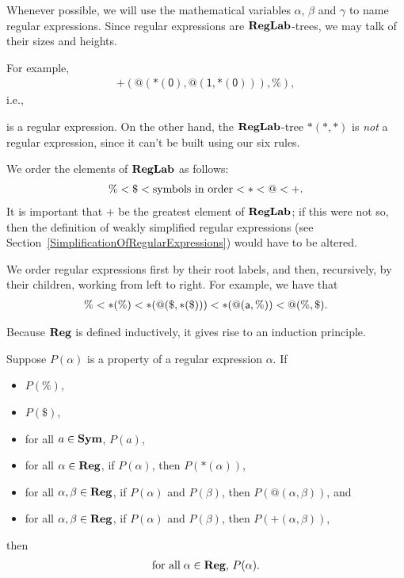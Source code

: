 Whenever possible, we will use the mathematical variables
$\alpha$, $\beta$ and $\gamma$
%
%
to name regular expressions.  Since
regular expressions are $\mathbf{RegLab}$-trees, we may talk of their sizes
and heights.

For example,
\begin{gather*}
\mathsf{{+}(@({*}(0),@(1,{*}(0))),\%)} ,
\end{gather*}
i.e.,
\begin{center}

\end{center}
is a regular expression.  On the other hand, the $\mathbf{RegLab}$-tree
$*(*,*)$ is \emph{not} a regular expression, since it can't be
built using our six rules.

We order the elements of $\mathbf{RegLab}$ as follows:
\begin{gather*}
\% < \$ < \allowbreak\mbox{symbols in order}\allowbreak < {*} < @ < {+} .
\end{gather*}
%
It is important that ${+}$ be the greatest element of $\mathbf{RegLab}$;
if this were not so, then the definition of weakly simplified regular
expressions (see Section~\ref{SimplificationOfRegularExpressions})
would have to be altered.

We order regular expressions first by their root labels, and then,
recursively, by their children, working from left to right.
For example, we have that
\begin{gather*}
\% < {*}(\%)
   < {*}(@(\$,{*}(\$)))
   < {*}(@(\mathsf{a},\%))
   < @(\%,\$) .
\end{gather*}

Because $\mathbf{Reg}$ is defined inductively, it gives rise to an induction
principle.

\begin{theorem}
Suppose $P(\alpha)$ is a property of a regular expression $\alpha$.
If
\begin{itemize}
\item $P(\%)$,

\item $P(\$)$,

\item for all $a\in\mathbf{Sym}$, $P(a)$,

\item for all $\alpha\in\mathbf{Reg}$, if $P(\alpha)$, then
$P({*}(\alpha))$,

\item for all $\alpha,\beta\in\mathbf{Reg}$, if $P(\alpha)$ and
$P(\beta)$, then $P(@(\alpha,\beta))$, and

\item for all $\alpha,\beta\in\mathbf{Reg}$, if $P(\alpha)$ and
$P(\beta)$, then $P({+}(\alpha,\beta))$,
\end{itemize}
then
\begin{gather*}
\allowbreak\mbox{for all}\allowbreak\;\alpha\in\mathbf{Reg},\,P(\alpha) .
\end{gather*}
\end{theorem}


